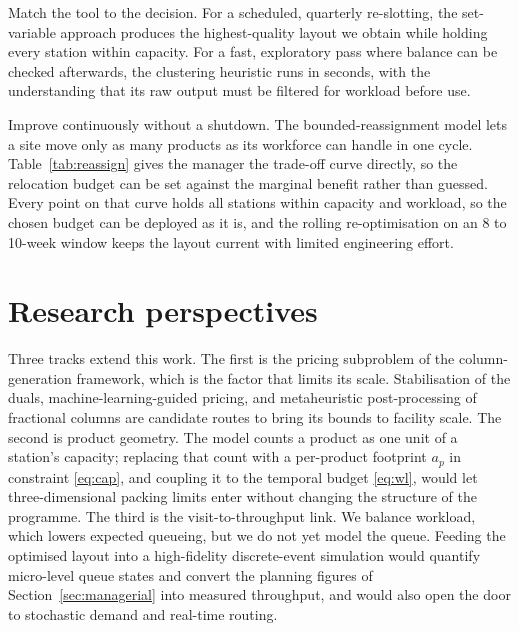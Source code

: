 \documentclass[]{interact}
\begin{document}
Match the tool to the decision. For a scheduled, quarterly re-slotting, the set-variable approach produces the highest-quality layout we obtain while holding every station within capacity. For a fast, exploratory pass where balance can be checked afterwards, the clustering heuristic runs in seconds, with the understanding that its raw output must be filtered for workload before use.

Improve continuously without a shutdown. The bounded-reassignment model lets a site move only as many products as its workforce can handle in one cycle. Table~\ref{tab:reassign} gives the manager the trade-off curve directly, so the relocation budget can be set against the marginal benefit rather than guessed. Every point on that curve holds all stations within capacity and workload, so the chosen budget can be deployed as it is, and the rolling re-optimisation on an 8 to 10-week window keeps the layout current with limited engineering effort.

\section{Research perspectives}\label{sec:perspectives}
Three tracks extend this work. The first is the pricing subproblem of the column-generation framework, which is the factor that limits its scale. Stabilisation of the duals, machine-learning-guided pricing, and metaheuristic post-processing of fractional columns are candidate routes to bring its bounds to facility scale. The second is product geometry. The model counts a product as one unit of a station's capacity; replacing that count with a per-product footprint $a_p$ in constraint \eqref{eq:cap}, and coupling it to the temporal budget \eqref{eq:wl}, would let three-dimensional packing limits enter without changing the structure of the programme. The third is the visit-to-throughput link. We balance workload, which lowers expected queueing, but we do not yet model the queue. Feeding the optimised layout into a high-fidelity discrete-event simulation would quantify micro-level queue states and convert the planning figures of Section~\ref{sec:managerial} into measured throughput, and would also open the door to stochastic demand and real-time routing.

\end{document}
